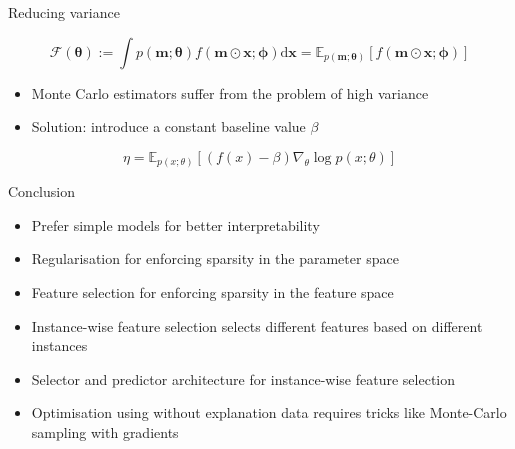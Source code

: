 \documentclass[11pt,compress,t,notes=noshow, aspectratio=169, xcolor=table]{beamer}
\begin{document}
\begin{frame}{Reducing variance}
  
  \begin{equation*}
     \mathcal{F}(\boldsymbol{\theta}):=\int p(\mathbf{m} ; \boldsymbol{\theta}) f(\mathbf{m} \odot \mathbf{x} ; \boldsymbol{\phi}) \mathrm{d} \mathbf{x}=\mathbb{E}_{p(\mathbf{m} ; \boldsymbol{\theta})}[f(\mathbf{m} \odot \mathbf{x} ; \boldsymbol{\phi})]
\end{equation*}

  \bigskip
  \begin{itemize}
      \item Monte Carlo estimators suffer from the problem of high variance
      \item Solution: introduce a constant baseline value $\beta$
  \end{itemize}
  \bigskip
 
 
 \begin{equation*}
     \eta = \mathbb{E}_{p(x;\theta)}[(f(x) - \beta)\nabla_\theta \log p(x;\theta)]
 \end{equation*} 
  
  
  
\end{frame}

\begin{frame}[c]{Conclusion}
    \begin{itemize}
        \item Prefer simple models for better interpretability
        \item Regularisation for enforcing sparsity in the parameter space
        \item Feature selection for enforcing sparsity in the feature space
        \item Instance-wise feature selection selects different features based on different instances
        \item Selector and predictor architecture for instance-wise feature selection
        \item Optimisation using without explanation data requires tricks like Monte-Carlo sampling
with gradients
    \end{itemize}
\end{frame}
\end{document}
